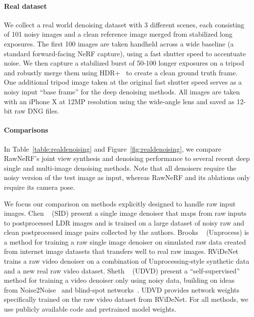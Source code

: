 \paragraph{Real dataset} We collect a real world denoising dataset with 3 different scenes, each consisting of 101 noisy images and a clean reference image merged from stabilized long exposures. The first 100 images are taken handheld across a wide baseline (a standard forward-facing NeRF capture), using a fast shutter speed to accentuate noise. We then capture a stabilized burst of 50-100 longer exposures on a tripod and robustly merge them using HDR+~\cite{hdrplus} to create a clean ground truth frame. One additional tripod image taken at the original fast shutter speed serves as a noisy input ``base frame'' for the deep denoising methods. All images are taken with an iPhone X at 12MP resolution using the wide-angle lens and saved as 12-bit raw DNG files.


\paragraph{Comparisons} In Table~\ref{table:realdenoising} and Figure~\ref{fig:realdenoising}, we compare RawNeRF's joint view synthesis and denoising performance to several recent deep single and multi-image denoising methods. Note that all denoisers require the noisy version of the test image as input, whereas RawNeRF and its ablations only require its camera pose.






We focus our comparison on methods explicitly designed to handle raw input images. Chen \etal~\cite{chen2018cvpr} (SID) present a single image denoiser that maps from raw inputs to postprocessed LDR images and is trained on a large dataset of noisy raw and clean postprocessed image pairs collected by the authors. Brooks \etal~\cite{brooks2019cvpr} (Unprocess) is a method for training a raw single image denoiser on simulated raw data created from internet image datasets that transfers well to real raw images. RViDeNet~\cite{rvidenet} trains a raw video denoiser on a combination of Unprocessing-style synthetic data and a new real raw video dataset. Sheth \etal~\cite{udvd} (UDVD) present a ``self-supervised'' method for training a video denoiser only using noisy data, building on ideas from Noise2Noise~\cite{lehtinen2018} and blind-spot networks~\cite{laine2019blindspot}. UDVD provides network weights specifically trained on the raw video dataset from RViDeNet. For all methods, we use publicly available code and pretrained model weights.

